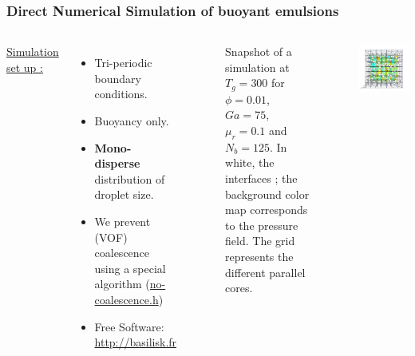 \documentclass{sintefbeamer}
\begin{document}
\begin{frame}
\frametitle{Direct Numerical Simulation of buoyant emulsions}
\begin{columns}
\underline{Simulation set up :} 
\begin{itemize}
\item Tri-periodic boundary conditions.
\item Buoyancy only.
\item \textbf{Mono-disperse} distribution of droplet size.
\item We prevent (VOF) coalescence using a special algorithm 
  (\href{http://basilisk.fr/src/no-coalescence.h}{no-coalescence.h})
\item Free Software: \url{http://basilisk.fr}
\end{itemize}

\begin{figure}
  \caption{Snapshot of a simulation at $T_g = 300$ for $\phi = 0.01$, $Ga = 75$, $\mu_r = 0.1$ and $N_b = 125$. In white, the interfaces ; the background color map corresponds to the pressure field. The grid represents the different parallel cores.
  }
\end{figure}
\centering
\includegraphics[width =  1.1\textwidth]{image/PHI_01_Ga_75.png}
\end{columns}
\end{frame}
\end{document}
